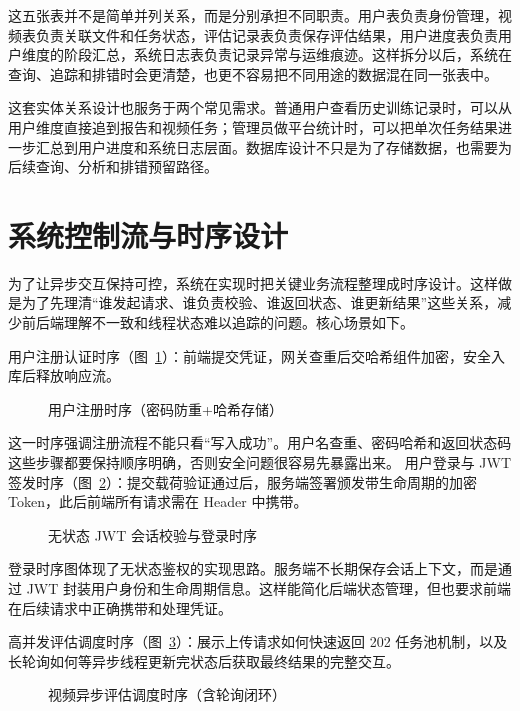 这五张表并不是简单并列关系，而是分别承担不同职责。用户表负责身份管理，视频表负责关联文件和任务状态，评估记录表负责保存评估结果，用户进度表负责用户维度的阶段汇总，系统日志表负责记录异常与运维痕迹。这样拆分以后，系统在查询、追踪和排错时会更清楚，也更不容易把不同用途的数据混在同一张表中。

这套实体关系设计也服务于两个常见需求。普通用户查看历史训练记录时，可以从用户维度直接追到报告和视频任务；管理员做平台统计时，可以把单次任务结果进一步汇总到用户进度和系统日志层面。数据库设计不只是为了存储数据，也需要为后续查询、分析和排错预留路径。

\section{系统控制流与时序设计}
为了让异步交互保持可控，系统在实现时把关键业务流程整理成时序设计。这样做是为了先理清“谁发起请求、谁负责校验、谁返回状态、谁更新结果”这些关系，减少前后端理解不一致和线程状态难以追踪的问题。核心场景如下。

用户注册认证时序（图~\ref{fig:register_seq}）：前端提交凭证，网关查重后交哈希组件加密，安全入库后释放响应流。

\begin{figure}[!htbp]
  \centering
  \YogaRegisterSequenceTikZ
  \caption{用户注册时序（密码防重+哈希存储）}
  \label{fig:register_seq}
\end{figure}

这一时序强调注册流程不能只看“写入成功”。用户名查重、密码哈希和返回状态码这些步骤都要保持顺序明确，否则安全问题很容易先暴露出来。
用户登录与 JWT 签发时序（图~\ref{fig:login_seq}）：提交载荷验证通过后，服务端签署颁发带生命周期的加密 Token，此后前端所有请求需在 Header 中携带。

\begin{figure}[!htbp]
  \centering
  \YogaLoginSequenceTikZ
  \caption{无状态 JWT 会话校验与登录时序}
  \label{fig:login_seq}
\end{figure}

登录时序图体现了无状态鉴权的实现思路。服务端不长期保存会话上下文，而是通过 JWT 封装用户身份和生命周期信息。这样能简化后端状态管理，但也要求前端在后续请求中正确携带和处理凭证。

高并发评估调度时序（图~\ref{fig:assessment_seq}）：展示上传请求如何快速返回 202 任务池机制，以及长轮询如何等异步线程更新完状态后获取最终结果的完整交互。

\begin{figure}[!htbp]
  \centering
  \YogaAssessmentSequenceTikZ
  \caption{视频异步评估调度时序（含轮询闭环）}
  \label{fig:assessment_seq}
\end{figure}

